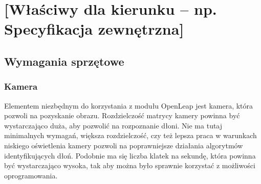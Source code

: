 

\chapter{[Właściwy dla kierunku -- np. Specyfikacja zewnętrzna]}


\section{Wymagania sprzętowe}
\subsection{Kamera}
\quad Elementem niezbędnym do korzystania z modułu OpenLeap jest kamera, która pozwoli na pozyskanie obrazu. Rozdzielczość matrycy kamery powinna być wystarczająco duża, aby pozwolić na rozpoznanie dłoni. Nie ma tutaj minimalnych wymagań, większa rozdzielczość, czy też lepsza praca w warunkach niskiego oświetlenia kamery pozwoli na poprawniejsze działania algorytmów identyfikujących dłoń. Podobnie ma się liczba klatek na sekundę, która powinna być wystarczająco wysoka, tak aby można było sprawnie korzystać z możliwości oprogramowania. 

